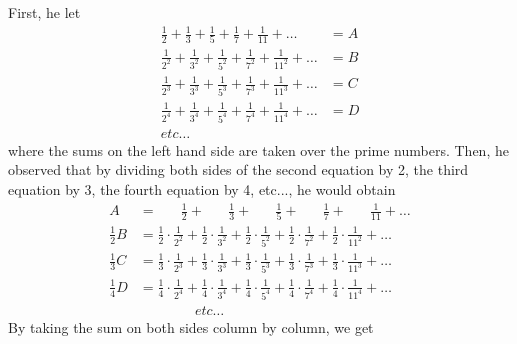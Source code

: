 First, he let 
\begin{align*}
    \frac{1}{2} + \frac{1}{3} + \frac{1}{5} + \frac{1}{7} + \frac{1}{11} + \dots &= A \\
    \frac{1}{2^2} + \frac{1}{3^2} + \frac{1}{5^2} + \frac{1}{7^2} + \frac{1}{11^2} + \dots &= B \\
    \frac{1}{2^3} + \frac{1}{3^3} + \frac{1}{5^3} + \frac{1}{7^3} + \frac{1}{11^3} + \dots &= C \\
    \frac{1}{2^4} + \frac{1}{3^4} + \frac{1}{5^4} + \frac{1}{7^4} + \frac{1}{11^4} + \dots &= D \\
    etc\dots \qquad \qquad &
\end{align*}
where the sums on the left hand side are taken over the prime numbers. Then, he observed that by dividing both sides of the second equation by 2, the third equation by 3, the fourth equation by 4, etc..., he would obtain 
\begin{align*}
    A &= \quad \ \ \: \frac{1}{2} + \quad \ \ \: \frac{1}{3} + \quad \ \ \: \frac{1}{5} + \quad \ \ \: \frac{1}{7} + \quad \ \ \: \frac{1}{11} + \dots \\
    \frac{1}{2}B &= \frac{1}{2}\cdot \frac{1}{2^2} + \frac{1}{2}\cdot\frac{1}{3^2} + \frac{1}{2}\cdot\frac{1}{5^2} + \frac{1}{2}\cdot\frac{1}{7^2} + \frac{1}{2}\cdot\frac{1}{11^2} + \dots \\
    \frac{1}{3}C &= \frac{1}{3}\cdot\frac{1}{2^3} + \frac{1}{3}\cdot\frac{1}{3^3} + \frac{1}{3}\cdot\frac{1}{5^3} + \frac{1}{3}\cdot\frac{1}{7^3} + \frac{1}{3}\cdot\frac{1}{11^3} + \dots \\
    \frac{1}{4}D &= \frac{1}{4}\cdot\frac{1}{2^4} + \frac{1}{4}\cdot\frac{1}{3^4} + \frac{1}{4}\cdot\frac{1}{5^4} + \frac{1}{4}\cdot\frac{1}{7^4} + \frac{1}{4}\cdot\frac{1}{11^4} + \dots \\
    & \qquad \qquad etc\dots
\end{align*}
By taking the sum on both sides column by column, we get
